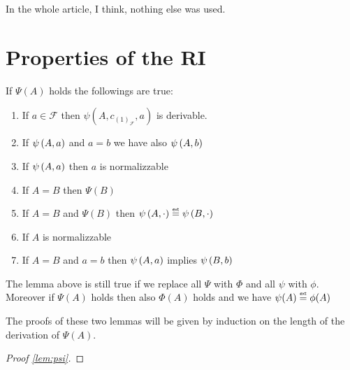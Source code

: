 		In the whole article, I think, nothing else was used.
		\newpage
\section{Properties of the RI}
	\begin{lem}\label{lem:psi}
	If $\Psi(A)$ holds the followings are true:
	\begin{enumerate}
		\item If $a \in \mathcal{F}$ then $\psi(A,c_{(1)_\mathcal{F}},a)$ is derivable.
		\item If $\psi\left(A,a\right)$ and \(a = b\) we have also  $\psi\left(A,b\right)$
		\item If  $\psi\left(A,a\right)$ then $a$ is normalizzable
		\item If $A=B$ then $\Psi(B)$
		\item If $A=B$ and $\Psi(B)$ then $\ps{A}{\cdot} \exteq \ps{B}{\cdot}$
		\item If $A$ is normalizzable
		\item If $A=B$ and $a=b$ then $\psi\left(A,a\right)$ implies $\psi\left(B,b\right)$
	\end{enumerate}
	\end{lem}
	\begin{lem}
	The lemma above is still true if we replace all $\Psi$ with $\Phi$ and all $\psi$ with $\phi$.
	Moreover if $\Psi(A)$ holds then also $\Phi(A)$ holds and we have $\psi(A) \exteq \phi(A)$
	\end{lem}
	The proofs of these two lemmas will be given by induction on the length of the derivation of $\Psi(A)$.
	
	\begin{proof}[Proof \ref{lem:psi}]
	\end{proof}
	
	
	
	
	
	
	
